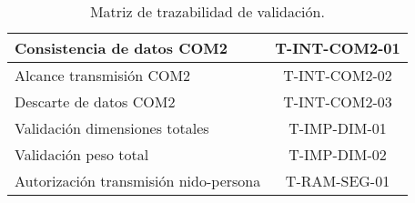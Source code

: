 \begin{table}[H]
\begin{tabular}{|l|c|}
Consistencia de datos COM2                & T-INT-COM2-01 \\ \hline
Alcance transmisión COM2                  & T-INT-COM2-02 \\ \hline
Descarte de datos COM2                    & T-INT-COM2-03 \\ \hline
Validación dimensiones totales            & T-IMP-DIM-01  \\ \hline
Validación peso total                     & T-IMP-DIM-02  \\ \hline
Autorización transmisión nido-persona     & T-RAM-SEG-01  \\ \hline
\end{tabular}
\caption{Matriz de trazabilidad de validación.}
\end{table}